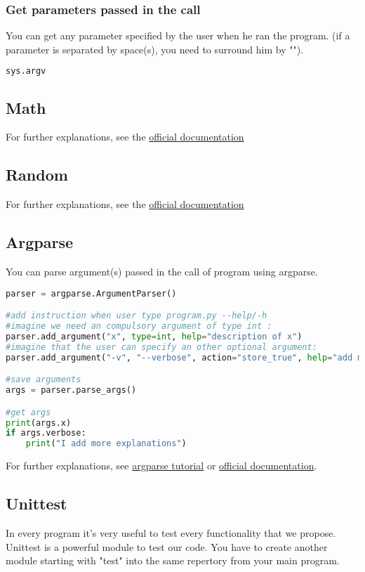 \documentclass[a4paper, 12pt, titlepage]{scrartcl} %
\begin{document}
\subsubsection{Get parameters passed in the call}
You can get any parameter specified by the user when he ran the program. (if a parameter is separated by space(s), you need to surround him by "").
\begin{lstlisting}[language=Python]
sys.argv
\end{lstlisting} \vspace{5mm}

\subsection{Math}
For further explanations, see the \href{https://docs.python.org/3/library/math.html}{official documentation}

\subsection{Random}
For further explanations, see the \href{https://docs.python.org/3/library/random.html}{official documentation}

\subsection{Argparse}
You can parse argument(s) passed in the call of program using argparse.
\begin{lstlisting}[language=Python]
parser = argparse.ArgumentParser()

#add instruction when user type program.py --help/-h
#imagine we need an compulsory argument of type int :
parser.add_argument("x", type=int, help="description of x")
#imagine that the user can specify an other optional argument:
parser.add_argument("-v", "--verbose", action="store_true", help="add more explanation")

#save arguments
args = parser.parse_args()

#get args
print(args.x)
if args.verbose:
    print("I add more explanations")
\end{lstlisting} \vspace{5mm}
For further explanations, see \href{http://www.sharelatex.com}{argparse tutorial} or  \href{https://docs.python.org/3/library/argparse.html}{official documentation}.


\subsection{Unittest}
In every program it's very useful to test every functionality that we propose. Unittest is a powerful module to test our code. You have to create another module starting with "test" into the same repertory from your main program.
\end{document}
